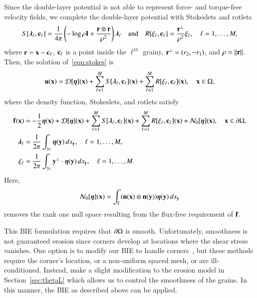\documentclass[preprint, 10pt]{elsarticle}
\begin{document}
Since the double-layer potential is not able to represent force- and
torque-free velocity fields,  we complete the double-layer potential
with Stokeslets and rotlets~\cite{pow-mir1987, pow1993}
\begin{align}
  S[{\boldsymbol\lambda}_\ell,{\mathbf{c}}_\ell] = \frac{1}{4\pi} \left(-\log \rho {\mathbf{I}} + 
    \frac{{\mathbf{r}} \otimes {\mathbf{r}}}{\rho^2} \right){\boldsymbol\lambda}_\ell
  \quad \text{and} \quad
  R[\xi_\ell,{\mathbf{c}}_\ell] = \frac{{\mathbf{r}}^\perp}{\rho^2}\xi_\ell, 
  \quad \ell=1,\ldots,M,
  \label{eqn:stokeslet_rotlet}
\end{align}
where  ${\mathbf{r}} = {\mathbf{x}} - {\mathbf{c}}_\ell$, ${\mathbf{c}}_\ell$ is a point inside the
$\ell^{th}$ grainy, ${\mathbf{r}}^\perp = (r_2,-r_1)$, and $\rho = \|{\mathbf{r}}\|$.
Then, the solution of~\eqref{eqn:stokes} is
\begin{align}
  \label{eqn:completed_DLP}
  {\mathbf{u}}({\mathbf{x}}) = {\mathcal{D}}[{\boldsymbol\eta}]({\mathbf{x}}) + 
    \sum_{\ell=1}^{M} S[{\boldsymbol\lambda}_\ell,{\mathbf{c}}_\ell]({\mathbf{x}}) +
    \sum_{\ell=1}^{M} R[\xi_\ell,{\mathbf{c}}_\ell]({\mathbf{x}}), \quad {\mathbf{x}} \in \Omega,
\end{align}
where the density function, Stokeslets, and rotlets satisfy
\begin{subequations}
\label{eqn:completed_BIE}
\begin{align}
  {\mathbf{f}}({\mathbf{x}}) &= -\frac{1}{2}{\boldsymbol\eta}({\mathbf{x}}) + {\mathcal{D}}[{\boldsymbol\eta}]({\mathbf{x}}) + 
      \sum_{\ell=1}^{M} S[{\boldsymbol\lambda}_\ell,{\mathbf{c}}_\ell]({\mathbf{x}}) +
      \sum_{\ell=1}^{M} R[\xi_\ell,{\mathbf{c}}_\ell]({\mathbf{x}}) + {\mathcal{N}}_0[{\boldsymbol\eta}]({\mathbf{x}}),
      \quad {\mathbf{x}} \in {\partial}\Omega, 
      \label{eqn:DLP}\\
  {\boldsymbol\lambda}_\ell &= \frac{1}{2\pi}\int_{\gamma_\ell} {\boldsymbol\eta}({\mathbf{y}}) \, ds_{\mathbf{y}},
  \quad \ell=1,\ldots,M,
  \label{eqn:stokeslet} \\
  \xi_\ell &= \frac{1}{2\pi}\int_{\gamma_\ell} {\mathbf{y}}^\perp \cdot {\boldsymbol\eta}({\mathbf{y}})
  \, ds_{\mathbf{y}}, \quad \ell=1,\ldots,M.
  \label{eqn:rotlet}
\end{align}
\end{subequations}
Here,
\begin{align*}
  {\mathcal{N}}_0[{\boldsymbol\eta}]({\mathbf{x}}) = \int_{\Gamma} 
    ({\mathbf{n}}({\mathbf{x}}) \otimes {\mathbf{n}}({\mathbf{y}})){\boldsymbol\eta}({\mathbf{y}}) \, ds_{\mathbf{y}}
\end{align*}
removes the rank one null space resulting from the flux-free requirement
of ${\mathbf{f}}$.

This BIE formulation requires that ${\partial}\Omega$ is smooth.
Unfortunately, smoothness is not guaranteed erosion since corners
develop at locations where the shear stress vanishes.  One option is to
modify our BIE to handle corners~\cite{rac-ser2017,
ser-rok2016, hel2011, gil-hao-mar2014, bre2012}, but these methods
require the corner's location, or a non-uniform spaced mesh, or are
ill-conditioned.  Instead, make a slight modification to the erosion
model in Section~\ref{sec:thetaL} which allows us to control the
smoothness of the grains.  In this manner, the BIE as described above
can be applied.
\end{document}
